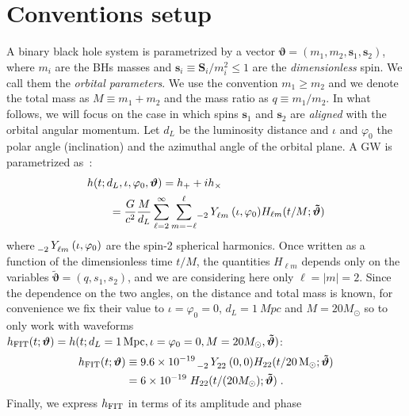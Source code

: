 \documentclass[twocolumn,showpacs,preprintnumbers,nofootinbib,prd,
superscriptaddress,10pt]{revtex4-1}
\begin{document}
\section{Conventions setup}
\label{sec:setup}
A binary black hole system is parametrized by a vector $ \boldsymbol{\vartheta} = (m_1,m_2, \mathbf{s}_1,\mathbf{s}_2) $, where $m_i$ are the 
BHs masses and $\mathbf{s}_i \equiv \mathbf{S}_i/m_i^2 \leq 1$ are the 
\textit{dimensionless} spin. We call them the \textit{orbital parameters}.
We use the convention $m_1\geq m_2$ and we denote the total mass as $M\equiv m_1+m_2$
and the mass ratio as $q\equiv m_1/m_2$.
In what follows, we will focus on the case in which spins $\mathbf{s}_1$ and $\mathbf{s}_2$ are \textit{aligned} with the orbital angular momentum. 
Let $d_L$ be the luminosity distance and $\iota$ and $\varphi_0$ the polar angle (inclination) and the azimuthal angle of the orbital plane.
A GW is parametrized as~\cite[Eq.~II.6]{ajith2011data}:
\begin{align} \label{eq:h_parametrization}
	&h(t; d_L,\iota,\varphi_0, \boldsymbol{\vartheta}) = h_+ + i h_\times \nonumber \\
		&\qquad= \frac{G}{c^2} \frac{M}{d_L}\sum_{\ell = 2}^{\infty} \sum_{m = -\ell}^{\ell} \tensor[_{-2}]{Y}{_{\ell m}}(\iota, \varphi_0) H_{\ell m}(t/M; \boldsymbol{\tilde{\vartheta}})
\end{align}
where $\tensor[_{-2}]{Y}{_{\ell m}}(\iota, \varphi_0)$ are the spin-2 spherical harmonics. 
Once written as a function of the dimensionless time $t/M$, the quantities $H_{\ell m}$ 
depends only on the variables $\tilde{\boldsymbol{\vartheta}} = (q, s_1, s_2)$, and we
are considering here only $\ell=|m|=2$.
Since the dependence on the two angles, on the distance and total mass is known, 
for convenience we fix their value to ${\iota = \varphi_0 = 0}$, ${d_L = \SI{1}{Mpc}}$ 
and $M = 20M_\odot$ so to only work with waveforms ${h_{\rm FIT}(t; \boldsymbol{\vartheta}) = h(t; d_L = \SI{1}{Mpc}, \iota = \varphi_0 = 0, 
M = 20M_\odot, \boldsymbol{\tilde{\vartheta}}) }$:
\begin{align}  
	h_{\rm FIT}(t; \boldsymbol{\vartheta}) &\equiv 9.6 \times 10^{-19} \; \tensor[_{-2}]{Y}{_{2 2}}(0,0) H_{22}(t/\SI{20}{M_\odot}; \boldsymbol{\tilde{\vartheta}})  \nonumber \\
	&= 6 \times 10^{-19} \; H_{22}(t/(20M_\odot); \boldsymbol{\tilde{\vartheta}}) \label{eq:h_std} \; .
\end{align}
Finally, we express  $h_{\rm FIT}$ in terms of its amplitude and phase
\end{document}
